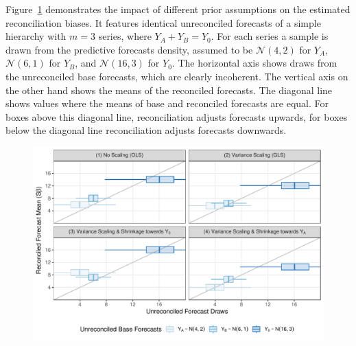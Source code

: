 \documentclass[a4paper,fleqn,11pt]{article}
\begin{document}
Figure~\ref{fig:weights} demonstrates the impact of different prior assumptions on the estimated reconciliation biases. It features identical unreconciled forecasts of a simple hierarchy with $m=3$ series, where $Y_A + Y_B = Y_0$. For each series a sample is drawn from the predictive forecasts density, assumed to be $\mathcal{N}(4,2)$ for $Y_A$, $\mathcal{N}(6,1)$ for $Y_B$, and $\mathcal{N}(16,3)$ for $Y_0$. The horizontal axis shows draws from the unreconciled base forecasts, which are clearly incoherent. The vertical axis on the other hand shows the means of the reconciled forecasts. The diagonal line shows values where the means of base and reconciled forecasts are equal. For boxes above this diagonal line, reconciliation adjusts forecasts upwards, for boxes below the diagonal line reconciliation adjusts forecasts downwards.
\begin{figure}[H]
	\includegraphics[width=\textwidth]{fig/fig_biases}
	\label{fig:weights}
\end{figure}
\end{document}
